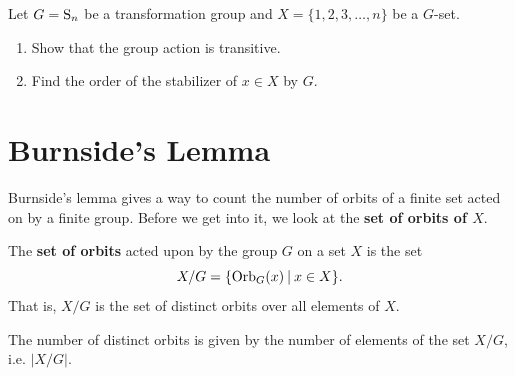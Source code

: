 \begin{exercise}
    Let $G = \mathrm{S}_{n}$ be a transformation group and $X = \{1, 2, 3, \dots, n\}$ be a $G$-set.
    \begin{enumerate}[label=(\roman*)]
        \item Show that the group action is transitive.
        \item Find the order of the stabilizer of $x \in X$ by $G$.
    \end{enumerate}
\end{exercise}

\section{Burnside's Lemma}
Burnside's lemma gives a way to count the number of orbits of a finite set acted on by a finite group. Before we get into it, we look at the \textbf{set of orbits of $X$}.

\begin{definition}
    The \textbf{set of orbits} acted upon by the group $G$ on a set $X$ is the set
    \[
        X / G = \{\Orb{G}{x} \vert x \in X\}.
    \]
    That is, $X/G$ is the set of distinct orbits over all elements of $X$.
\end{definition}
\begin{remark}
    The number of distinct orbits is given by the number of elements of the set $X/G$, i.e. $|X/G|$.
\end{remark}

\newpage

